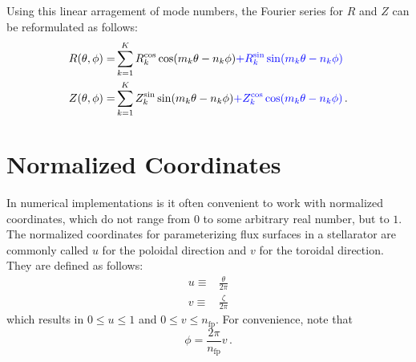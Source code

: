 Using this linear arragement of mode numbers, the Fourier series for $R$ and $Z$ can be reformulated as follows:
\begin{align}
    R(\theta, \phi) =& \sum_{k=1}^{K}   R_k^\mathrm{cos} \cos(m_k \theta - n_k \phi)
                        {\color{blue} + R_k^\mathrm{sin} \sin(m_k \theta - n_k \phi) } \label{eqn:linearFourierRPhi} \\
    Z(\theta, \phi) =& \sum_{k=1}^{K}   Z_k^\mathrm{sin} \sin(m_k \theta - n_k \phi)
                        {\color{blue} + Z_k^\mathrm{cos} \cos(m_k \theta - n_k \phi) } \label{eqn:linearFourierZPhi} \, .
\end{align}

\FloatBarrier
\section{Normalized Coordinates}
In numerical implementations is it often convenient to work with normalized coordinates,
which do not range from $0$ to some arbitrary real number, but to $1$.
The normalized coordinates for parameterizing flux surfaces in a stellarator
are commonly called $u$ for the poloidal direction and $v$ for the toroidal direction.
They are defined as follows:
\begin{align}
  u \equiv& \frac{\theta}{2 \pi} \\
  v \equiv& \frac{\zeta}{2 \pi}
\end{align}
which results in $0 \leq u \leq 1$ and $0 \leq v \leq n_\mathrm{fp}$.
For convenience, note that
\begin{equation}
  \phi = \frac{2 \pi}{n_\mathrm{fp}} v \label{eqn:phiFromV} \, .
\end{equation}

\FloatBarrier
